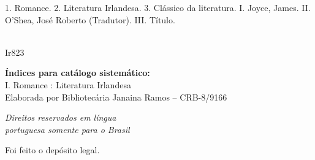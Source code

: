 {\hspace{20pt}\parbox{190pt}{1. Romance. 2. Literatura Irlandesa. 3. Clássico da literatura. I. Joyce, James. II. O'Shea, José Roberto (Tradutor). III. Título.}\\[6pt]

\hspace{188pt} Ir823\\

\hrulefill

\noindent{}\textbf{Índices para catálogo sistemático:}\\
\noindent{}I. Romance : Literatura Irlandesa\\[6pt]
\noindent{}Elaborada por Bibliotecária Janaina Ramos – CRB-8/9166


\vfill\textit{Direitos reservados em l\'ingua\\ portuguesa somente para o Brasil}\\\medskip

%
\bigskip
Foi feito o depósito legal.\\\endgroup
\pagebreak\raggedleft
\titulagem

{\Large \autor \par\vspace{1.5ex}}
\vspace{8.5mm}

}
